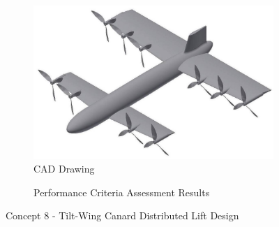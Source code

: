 


\begin{figure}[H]
\centering
\begin{subfigure}[t]{.5\textwidth}
  \centering
  \includegraphics[width=0.95\linewidth]{Concepts/CAD/Round2_3_cad.jpg}
  \vspace{0.125cm}
  \caption{CAD Drawing}
  \label{fig:cad8}
\end{subfigure}%
\begin{subfigure}[t]{.5\textwidth}
  \centering
  \caption{Performance Criteria Assessment Results}
  \label{fig:radar8}
\end{subfigure}
\caption{Concept 8 - Tilt-Wing Canard Distributed Lift Design}
\label{fig:concept8}
\end{figure}

